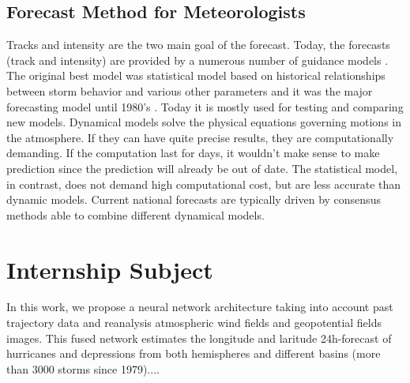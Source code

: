 \subsection{Forecast Method for Meteorologists}
Tracks and intensity are the two main goal of the forecast. Today, the forecasts (track and intensity) are provided by a numerous number of guidance models \cite{nhc_models}. The original best model was statistical model based on historical relationships between storm behavior and various other parameters and it was the major forecasting model until 1980's \cite{demaria2005further}. Today it is mostly used for testing and comparing new models. Dynamical models solve the physical equations governing motions in the atmosphere. If they can have quite precise results, they are computationally demanding. If the computation last for days, it wouldn't make sense to make prediction since the prediction will already be out of date. The statistical model, in contrast, does not demand high computational cost, but are less accurate than dynamic models. Current national forecasts are typically driven by consensus methods able to combine different dynamical models.






\section{Internship Subject}
\label{sec:subject}
In this work, we propose a neural network architecture taking into account past trajectory data and reanalysis atmospheric wind fields and geopotential fields images. This fused network estimates the longitude and laritude 24h-forecast of hurricanes and depressions from both hemispheres and different basins (more than 3000 storms since 1979)....


